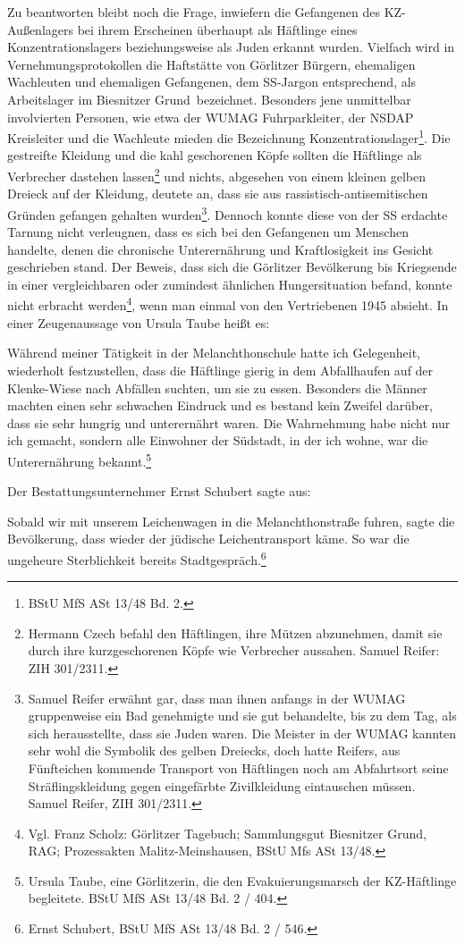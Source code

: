 Zu beantworten bleibt noch die Frage, inwiefern die Gefangenen des KZ-Außenlagers bei ihrem Erscheinen überhaupt als Häftlinge eines Konzentrationslagers beziehungsweise als Juden erkannt wurden. Vielfach wird in Vernehmungsprotokollen die Haftstätte von Görlitzer Bürgern, ehemaligen Wachleuten und ehemaligen Gefangenen, dem SS-Jargon entsprechend, als \glqq Arbeitslager im Biesnitzer Grund\grqq~bezeichnet. Besonders jene unmittelbar involvierten Personen, wie etwa der WUMAG Fuhrparkleiter, der NSDAP Kreisleiter und die Wachleute mieden die Bezeichnung Konzentrationslager\footnote{BStU MfS ASt 13/48 Bd. 2.}. Die gestreifte Kleidung und die kahl geschorenen Köpfe sollten die Häftlinge als Verbrecher dastehen lassen\footnote{Hermann Czech befahl den Häftlingen, ihre Mützen abzunehmen, damit sie durch ihre kurzgeschorenen Köpfe wie Verbrecher aussahen. Samuel Reifer: ZIH 301/2311.} und nichts, abgesehen von einem kleinen gelben Dreieck auf der Kleidung, deutete an, dass sie aus rassistisch-antisemitischen Gründen gefangen gehalten wurden\footnote{Samuel Reifer erwähnt gar, dass man ihnen anfangs in der WUMAG gruppenweise ein Bad genehmigte und sie gut behandelte, bis zu dem Tag, als sich herausstellte, dass sie Juden waren. Die Meister in der WUMAG kannten sehr wohl die Symbolik des gelben Dreiecks, doch hatte Reifers, aus Fünfteichen kommende Transport von Häftlingen noch am Abfahrtsort seine Sträflingskleidung gegen eingefärbte Zivilkleidung eintauschen müssen. Samuel Reifer, ZIH 301/2311.}. Dennoch konnte diese von der SS erdachte Tarnung nicht verleugnen, dass es sich bei den Gefangenen um Menschen handelte, denen die chronische Unterernährung und Kraftlosigkeit ins Gesicht geschrieben stand. Der Beweis, dass sich die Görlitzer Bevölkerung bis Kriegsende in einer vergleichbaren oder zumindest ähnlichen Hungersituation befand, konnte nicht erbracht werden\footnote{Vgl. Franz Scholz: \glqq Görlitzer Tagebuch\grqq; Sammlungsgut Biesnitzer Grund, RAG; Prozessakten Malitz-Meinshausen, BStU Mfs ASt 13/48.}, wenn man einmal von den Vertriebenen 1945 absieht. In einer Zeugenaussage von Ursula Taube heißt es:
\begin{leftbar}
Während meiner Tätigkeit in der Melanchthonschule hatte ich Gelegenheit, wiederholt festzustellen, dass die Häftlinge gierig in dem Abfallhaufen auf der Klenke-Wiese nach Abfällen suchten, um sie zu essen. Besonders die Männer machten einen sehr schwachen Eindruck und es bestand kein Zweifel darüber, dass sie sehr hungrig und unterernährt waren. Die Wahrnehmung habe nicht nur ich gemacht, sondern alle Einwohner der Südstadt, in der ich wohne, war die Unterernährung bekannt.\footnote{Ursula Taube, eine Görlitzerin, die den Evakuierungsmarsch der KZ-Häftlinge begleitete. BStU MfS ASt 13/48 Bd. 2 / 404.}\end{leftbar}
Der Bestattungsunternehmer Ernst Schubert sagte aus:
\begin{leftbar}
Sobald wir mit unserem Leichenwagen in die Melanchthonstraße fuhren, sagte die Bevölkerung, dass wieder der jüdische Leichentransport käme. So war die ungeheure Sterblichkeit bereits Stadtgespräch.\footnote{Ernst Schubert, BStU MfS ASt 13/48 Bd. 2 / 546.}
\end{leftbar}


